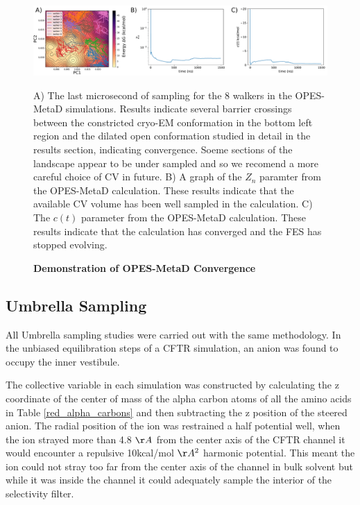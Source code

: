 \begin{figure}
	\begin{center}
		\includegraphics[width=1\textwidth]{figures/opening/FES_mw_trace.pdf}
	\end{center}
	\captionsetup{singlelinecheck = false, justification=raggedright}
	\caption[Demonstration of OPES-MetaD Convergence ] {\textbf{Demonstration of OPES-MetaD Convergence}}{A) The last microsecond of sampling for the 8 walkers in the OPES-MetaD simulations. Results indicate several barrier crossings between the constricted cryo-EM conformation in the bottom left region and the dilated open conformation studied in detail in the results section, indicating convergence. Soeme sections of the landscape appear to be under sampled and so we recomend a more careful choice of CV in future. B) A graph of the $Z_n$ paramter from the OPES-MetaD calculation. These results indicate that the available CV volume has been well sampled in the calculation. C) The $c(t)$ parameter from the OPES-MetaD calculation. These results indicate that the calculation has converged and the FES has stopped evolving. }
	\label{convergence_3}
\end{figure}

\subsection{Umbrella Sampling}
All Umbrella sampling studies were carried out with the same methodology. In the unbiased equilibration steps of a CFTR simulation, an anion was found to occupy the inner vestibule. 

The collective variable in each simulation was constructed by calculating the z coordinate of the center of mass of the alpha carbon atoms of all the amino acids in Table \ref{red_alpha_carbons} and then subtracting the z position of the steered anion. The radial position of the ion was restrained a half potential well, when the ion strayed more than 4.8 $\AA$ from the center axis of the CFTR channel it would encounter a repulsive 10kcal/mol $\AA^2$ harmonic potential. This meant the ion could not stray too far from the center axis of the channel in bulk solvent but while it was inside the channel it could adequately sample the interior of the selectivity filter.

